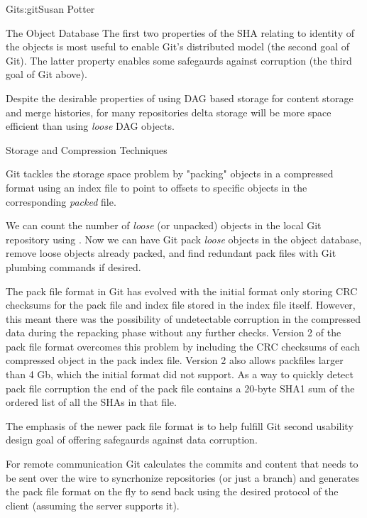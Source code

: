 \begin{aosachapter}{Git}{s:git}{Susan Potter}
\begin{aosasect1}{The Object Database}
The first two properties of the SHA relating to identity of the objects is
most useful to enable Git's distributed model (the second goal of Git).
The latter property enables some safegaurds against corruption (the third
goal of Git above).

Despite the desirable properties of using DAG based storage for content
storage and merge histories, for many repositories delta storage will be
more space efficient than using \emph{loose} DAG objects.

\end{aosasect1}

\begin{aosasect1}{Storage and Compression Techniques}

Git tackles the storage space problem by "packing" objects in a compressed
format using an index file to point to offsets to specific objects in the
corresponding \emph{packed} file.


We can count the number of \emph{loose} (or unpacked) objects in the local
Git repository using . Now we can have Git pack
\emph{loose} objects in the object database, remove loose objects already
packed, and find redundant pack files with Git plumbing commands if desired.

The pack file format in Git has evolved with the initial format only storing
CRC checksums for the pack file and index file stored in the index file
itself. However, this meant there was the possibility of undetectable
corruption in the compressed data during the repacking phase without any
further checks. Version 2 of the pack file format overcomes this problem by
including the CRC checksums of each compressed object in the pack index
file. Version 2 also allows packfiles larger than 4 Gb, which the initial
format did not support. As a way to quickly detect pack file corruption the
end of the pack file contains a 20-byte SHA1 sum of the ordered list of all
the SHAs in that file.

The emphasis of the newer pack file format is to help fulfill Git second
usability design goal of offering safegaurds against data corruption.

For remote communication Git calculates the commits and content that needs
to be sent over the wire to syncrhonize repositories (or just a branch) and
generates the pack file format on the fly to send back using the desired
protocol of the client (assuming the server supports it).


\end{aosasect1}
\end{aosachapter}

